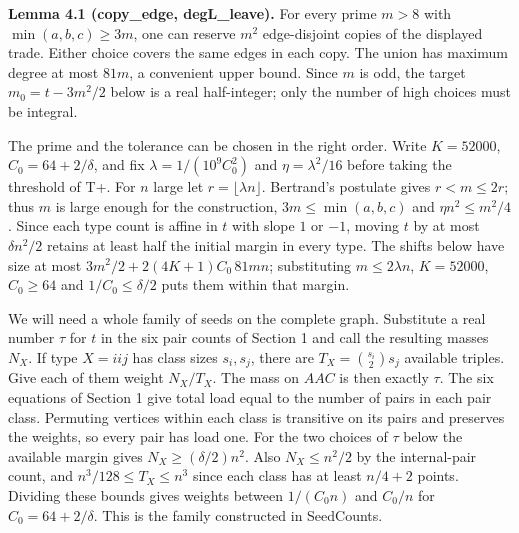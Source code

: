 \documentclass[english,11pt,a4paper]{article}
\begin{document}
\textbf{Lemma 4.1 (copy\_edge, degL\_leave).} For every prime \(m>8\) with \(\min(a,b,c)\ge3m\), one can reserve \(m^2\) edge-disjoint copies of the displayed trade. Either choice covers the same edges in each copy. The union has maximum degree at most \(81m\), a convenient upper bound. Since \(m\) is odd, the target \(m_0=t-3m^2/2\) below is a real half-integer; only the number of high choices must be integral.

The prime and the tolerance can be chosen in the right order. Write \(K=52000\), \(C_0=64+2/\delta\), and fix \(\lambda=1/(10^9 C_0^2)\) and \(\eta=\lambda^2/16\) before taking the threshold of T+. For \(n\) large let \(r=\lfloor\lambda n\rfloor\). Bertrand's postulate gives \(r<m\le2r\); thus \(m\) is large enough for the construction, \(3m\le\min(a,b,c)\) and \(\eta n^2\le m^2/4\). Since each type count is affine in \(t\) with slope \(1\) or \(-1\), moving \(t\) by at most \(\delta n^2/2\) retains at least half the initial margin in every type. The shifts below have size at most \(3m^2/2+2(4K+1)C_0\,81mn\); substituting \(m\le2\lambda n\), \(K=52000\), \(C_0\ge64\) and \(1/C_0\le\delta/2\) puts them within that margin.

We will need a whole family of seeds on the complete graph. Substitute a real number \(\tau\) for \(t\) in the six pair counts of Section 1 and call the resulting masses \(N_X\). If type \(X=iij\) has class sizes \(s_i,s_j\), there are \(T_X=\binom{s_i}{2}s_j\) available triples. Give each of them weight \(N_X/T_X\). The mass on \(AAC\) is then exactly \(\tau\). The six equations of Section 1 give total load equal to the number of pairs in each pair class. Permuting vertices within each class is transitive on its pairs and preserves the weights, so every pair has load one. For the two choices of \(\tau\) below the available margin gives \(N_X\ge(\delta/2)n^2\). Also \(N_X\le n^2/2\) by the internal-pair count, and \(n^3/128\le T_X\le n^3\) since each class has at least \(n/4+2\) points. Dividing these bounds gives weights between \(1/(C_0 n)\) and \(C_0/n\) for \(C_0=64+2/\delta\). This is the family constructed in SeedCounts.
\end{document}
